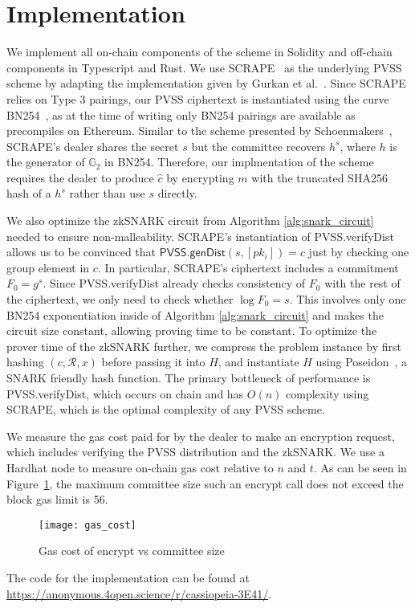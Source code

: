 \section{Implementation}

We implement all on-chain components of the scheme in Solidity and off-chain components in Typescript and Rust.
We use SCRAPE~\cite{pvss_scrape} as the underlying PVSS scheme by adapting the implementation given by Gurkan et al.~\cite{aggregatable_dkg}.
Since SCRAPE relies on Type 3 pairings, our PVSS ciphertext is instantiated using the curve BN254~\cite{bn254}, as at the time of writing only BN254 pairings are available as precompiles on Ethereum.
Similar to the scheme presented by Schoenmakers~\cite{pvss_schoenmakers}, SCRAPE's dealer shares the secret $s$ but the committee recovers $h^s$, where $h$ is the generator of $\mathbb{G}_2$ in BN254.
Therefore, our implmentation of the scheme requires the dealer to produce $\hat{c}$ by encrypting $m$ with the truncated SHA256 hash of a $h^s$ rather than use $s$ directly.

We also optimize the zkSNARK circuit from Algorithm \ref{alg:snark_circuit} needed to ensure non-malleability.
SCRAPE's instantiation of \textsf{PVSS.verifyDist} allows us to be convinced that $\textsf{PVSS.genDist}(s, [pk_i]) = c$ just by checking one group element in $c$.
In particular, SCRAPE's ciphertext includes a commitment $F_0 = g^s$.
Since \textsf{PVSS.verifyDist} already checks consistency of $F_0$ with the rest of the ciphertext, we only need to check whether $\log F_0 = s$.
This involves only one BN254 exponentiation inside of Algorithm \ref{alg:snark_circuit} and makes the circuit size constant, allowing proving time to be constant.
To optimize the prover time of the zkSNARK further, we compress the problem instance by first hashing $(c, \mathcal{R}, x)$ before passing it into $H$, and instantiate $H$ using Poseidon~\cite{poseidon}, a SNARK friendly hash function.
The primary bottleneck of performance is \textsf{PVSS.verifyDist}, which occurs on chain and has $O(n)$ complexity using SCRAPE, which is the optimal complexity of any PVSS scheme.


We measure the gas cost paid for by the dealer to make an encryption request, which includes verifying the PVSS distribution and the zkSNARK.
We use a Hardhat node to measure on-chain gas cost relative to $n$ and $t$.
As can be seen in Figure~\ref{fig:gas_cost}, the maximum committee size such an \textsf{encrypt} call does not exceed the block gas limit is 56. 
\begin{figure}\label{fig:gas_cost}
\caption{Gas cost of \textsf{encrypt} vs committee size}
\texttt{[image: gas\_cost]}
\end{figure}


The code for the implementation can be found at \url{https://anonymous.4open.science/r/cassiopeia-3E41/}.
